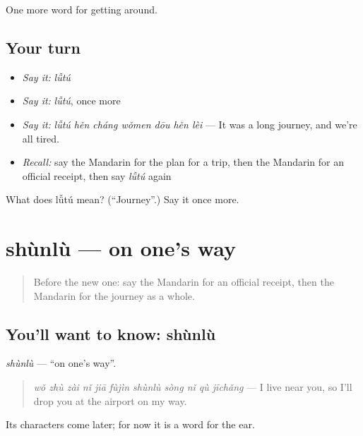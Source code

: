 \begin{grammarlens}[title={What you've built}]
One more word for getting around.
\end{grammarlens}

\subsection*{Your turn}
\begin{itemize}
\raggedright
  \item \emph{Say it:} \emph{lǚtú}
  \item \emph{Say it:} \emph{lǚtú}, once more
  \item \emph{Say it:} \emph{lǚtú hěn cháng wǒmen dōu hěn lèi} — It was a long journey, and we're all tired.
  \item \emph{Recall:} say the Mandarin for the plan for a trip, then the Mandarin for an official receipt, then say \emph{lǚtú} again
\end{itemize}

\begin{tcolorbox}[breakable,colback=teal!4,colframe=teal!35!black,title={Before you move on}]
What does lǚtú mean? (\textquotedblleft{}Journey\textquotedblright{}.) Say it once more.
\end{tcolorbox}
\section[shùnlù]{shùnlù — on one's way}

\label{lesson:ZH-C429-shunlu}



\begin{quote}
Before the new one: say the Mandarin for an official receipt, then the Mandarin for the journey as a whole.
\end{quote}

\subsection*{You'll want to know: shùnlù}
\emph{shùnlù} — \textquotedblleft{}on one's way\textquotedblright{}.

\begin{quote}
\emph{wǒ zhù zài nǐ jiā fùjìn shùnlù sòng nǐ qù jīchǎng} — I live near you, so I'll drop you at the airport on my way.
\end{quote}

Its characters come later; for now it is a word for the ear.

